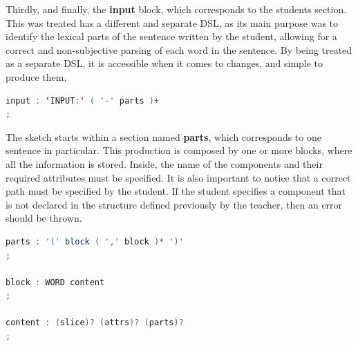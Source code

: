 Thirdly, and finally, the \textbf{input} block, which corresponds to the students section. This was treated has a different and separate \textsc{DSL}, as its main purpose was to identify the lexical parts of the sentence written 
by the student, allowing for a correct and non-subjective parsing of each word in the sentence. By being treated as a separate \textsc{DSL}, it is accessible when it comes to changes, and simple to produce them.

\begin{center}
\begin{minipage}{8cm}
\begin{lstlisting}[language=java, basicstyle=\small, label={lst:dsl_input_prod}, caption=DSL input production]
input : 'INPUT:' ( '-' parts )+
;
\end{lstlisting}
\end{minipage}
\end{center}



The sketch starts within a section named \textbf{parts}, which corresponds to one sentence in particular. This production is composed by one or more blocks, where all the information is stored. Inside, the name of the components and their required attributes must be specified. It is also important to notice that a correct path must be specified by the student. If the student specifies a component that is not declared in the structure defined previously by the teacher, then an error should be thrown.

\begin{center}
\begin{minipage}{10cm}
\begin{lstlisting}[language=java, basicstyle=\small, label={lst:dsl_parts_prod}, caption=DSL parts/component/content productions]
parts : '(' block ( ',' block )* ')'
;

block : WORD content
;

content : (slice)? (attrs)? (parts)?
;
\end{lstlisting}
\end{minipage}
\end{center}

